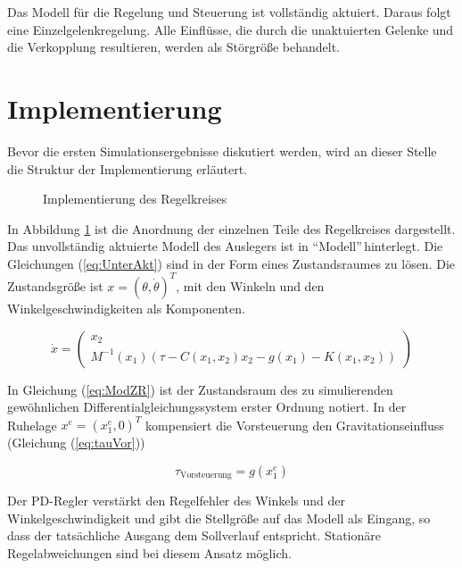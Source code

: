 Das Modell für die Regelung und Steuerung ist vollständig aktuiert. Daraus folgt eine Einzelgelenkregelung. Alle Einflüsse, die durch die unaktuierten Gelenke und die Verkopplung resultieren, werden als Störgröße behandelt.

\section*{Implementierung} 

Bevor die ersten Simulationsergebnisse diskutiert werden, wird an dieser Stelle die Struktur der Implementierung erläutert.

\begin{figure}[h]
	\centering
	
	\caption[]{Implementierung des Regelkreises}
	\label{fig:Implementierung}
\end{figure}

In Abbildung \ref{fig:Implementierung} ist die Anordnung der einzelnen Teile des Regelkreises dargestellt. Das unvollständig aktuierte Modell des Auslegers ist in \textquotedblleft Modell\textquotedblright \,hinterlegt. Die Gleichungen (\ref{eq:UnterAkt}) sind in der Form eines Zustandsraumes zu lösen. Die Zustandsgröße ist $x=(\theta,\dot{\theta})^T$, mit den Winkeln und den Winkelgeschwindigkeiten als Komponenten.

\begin{equation} \label{eq:ModZR}
\dot{x}	=	\begin{pmatrix}
				x_2 \\
				M^{-1}(x_{1})(\tau - C(x_1,x_2)x_2 - g(x_1) - K(x_1,x_2))
			\end{pmatrix}
\end{equation}

In Gleichung (\ref{eq:ModZR}) ist der Zustandsraum des zu simulierenden gewöhnlichen Differentialgleichungssystem erster Ordnung notiert. In der Ruhelage $x^e=(x_1^e,0)^T$ kompensiert die Vorsteuerung den Gravitationseinfluss (Gleichung (\ref{eq:tauVor})) 

\begin{equation} \label{eq:tauVor}
\tau_{\mathrm{Vorsteuerung}} = g(x_1^e)
\end{equation}

Der PD-Regler verstärkt den Regelfehler des Winkels und der Winkelgeschwindigkeit und gibt die Stellgröße auf das Modell als Eingang, so dass der tatsächliche Ausgang dem Sollverlauf entspricht. Stationäre Regelabweichungen sind bei diesem Ansatz möglich.

